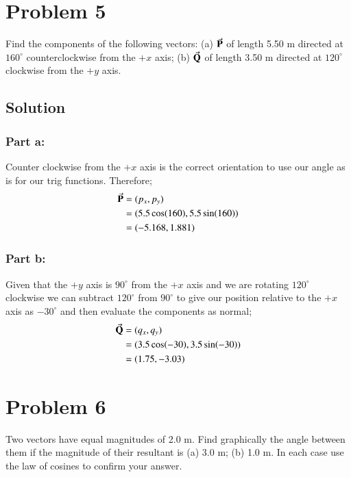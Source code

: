 \documentclass{article}
\begin{document}
\section*{Problem 5}
Find the components of the following vectors: (a) $\va P$ of length 5.50 m directed at $160^\circ$
counterclockwise from the $+x$ axis; (b) $\va Q$ of length 3.50 m directed at $120^\circ$ clockwise from the
$+y$ axis.

\subsection*{Solution}
\subsubsection*{Part a:}
Counter clockwise from the $+x$ axis is the correct orientation to use our angle as is for our trig functions. Therefore;
\begin{align*}
	\va P &= (p_x,p_y)\\
	&= (5.5\cos(160),5.5\sin(160)) \\
	&= (-5.168,1.881)
\end{align*}

\subsubsection*{Part b:}
Given that the $+y$ axis is $90^\circ$ from the $+x$ axis and we are rotating $120^\circ$ clockwise we can subtract $120^\circ$ from $90^\circ$ to give our position relative to the $+x$ axis as $-30^\circ$ and then evaluate the components as normal;
\begin{align*}
	\va Q &= (q_x,q_y)\\
	&= (3.5\cos(-30),3.5\sin(-30)) \\
	&= (1.75,-3.03)
\end{align*}

\section*{Problem 6}
Two vectors have equal magnitudes of 2.0 m. Find graphically the angle between them if the
magnitude of their resultant is (a) 3.0 m; (b) 1.0 m. In each case use the law of cosines to confirm
your answer.
\end{document}
